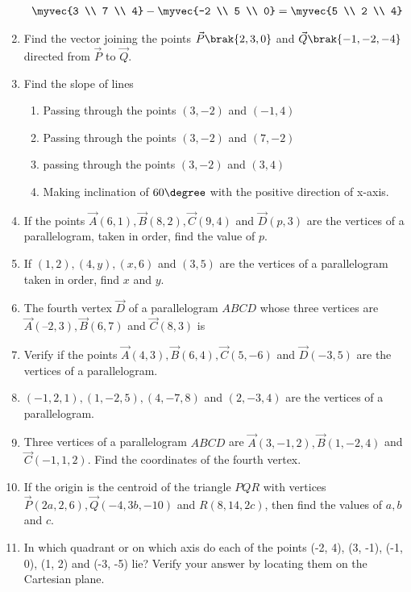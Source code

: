\begin{enumerate}[label=\thesubsection.\arabic*, ref=\thesubsection.\theenumi]
\begin{align}
	\myvec{3 \\ 7 \\ 4}
	-\myvec{-2 \\ 5 \\ 0} = 
	\myvec{5 \\ 2 \\ 4}  
\end{align}
\item Find the vector joining the points $\vec{P}\brak{2, 3, 0}$ and $\vec{Q}\brak{-1, -2, -4}$ directed from $\vec{P}$ to $\vec{Q}$.
\item Find the slope of lines
\begin{enumerate}
\item  Passing through the points $(3, -2)$ and $(-1, 4)$
\item  Passing through the points $(3, -2)$ and $(7, -2)$
\item  passing through the points $(3, -2)$ and $(3, 4)$	
\item  Making inclination of $60\degree$ with the positive direction of x-axis.
\end{enumerate}
\item If the points $\vec{A}(6,  1),  \vec{B}(8,  2),  \vec{C}(9,  4)$ and $\vec{D}(p,  3)$ are the vertices of a parallelogram,  taken in order,  find the value of $p$.
\label{10/7/0/10}
\item 
If $(1,  2),  (4,  y),  (x,  6)$ and $(3,  5)$ are the vertices of a parallelogram taken in order,  find $x$ and $y$.
\label{10/7/2/6}
\item The fourth vertex $\vec{D}$ of a parallelogram $ABCD$ whose three vertices are
	$\vec{A} (–2,  3),  \vec{B} (6,  7)$ and  $\vec{C} (8,  3)$ is
\item Verify if the points $\vec{A}(4, 3),  \vec{B}(6, 4), \vec{C}(5, -6)$  and  $\vec{D}(-3, 5)$ are the vertices of a parallelogram.
\item $(-1, 2, 1),  (1, -2, 5),  (4, -7, 8)$ and $(2, -3, 4)$ are the vertices of a parallelogram.
\item Three vertices of a parallelogram $ABCD$ are $\vec{A}(3, -1, 2),  \vec{B}(1, -2, 4)$ and $\vec{C}(-1, 1, 2)$. Find the coordinates of the fourth vertex.
\item If the origin is the centroid of the triangle $PQR$ with vertices $\vec{P}(2a, 2, 6),  \vec{Q}(-4, 3b, -10)$ and $R(8, 14, 2c)$,  then find the values of $a,  b$ and $c$.
\item In which quadrant or on which axis do each of the points (-2, 4), (3, -1), (-1, 0), (1, 2) and (-3, -5) lie? Verify your answer by locating them on the Cartesian plane.

\end{enumerate}
